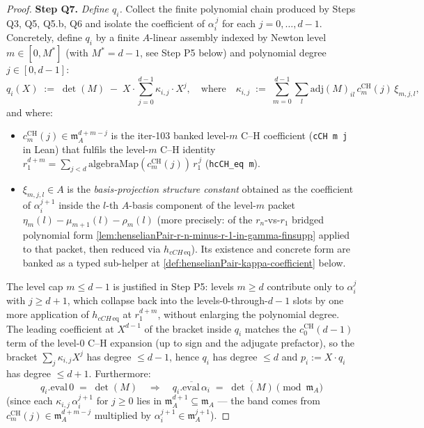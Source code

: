 \begin{proof}
\textbf{Step Q7.} \emph{Define $q_i$.}
Collect the finite polynomial chain produced by Steps Q3, Q5,
Q5.b, Q6 and isolate the coefficient of $\alpha_i^{\,j}$ for
each $j = 0, \ldots, d - 1$. Concretely, define $q_i$ by a
finite $A$-linear assembly indexed by Newton level
$m \in [0, M^*]$ (with $M^* = d - 1$, see Step P5 below) and
polynomial degree $j \in [0, d - 1]$:
\[
q_i(X) \;:=\;
\det(M)
\;-\; X \cdot \!\!\!\sum_{j = 0}^{d-1}\!\!
\kappa_{i,j} \cdot X^{j},
\quad\text{where}\quad
\kappa_{i,j} \;:=\; \sum_{m = 0}^{d - 1} \sum_l
\mathrm{adj}(M)_{il}\,c^{\mathrm{CH}}_m(j)\,\xi_{m,j,l},
\]
and where:
\begin{itemize}
\item $c^{\mathrm{CH}}_m(j) \in \mathfrak m_A^{d + m - j}$ is the
iter-103 banked level-$m$ C--H coefficient (\texttt{cCH m j} in
Lean) that fulfils the level-$m$ C--H identity
$r_1^{d+m} = \sum_{j < d} \mathrm{algebraMap}(c^{\mathrm{CH}}_m(j))
\,r_1^{\,j}$ (\texttt{hcCH\_eq m}).
\item $\xi_{m,j,l} \in A$ is the \emph{basis-projection structure
constant} obtained as the coefficient of $\alpha_i^{j+1}$ inside
the $l$-th $A$-basis component of the level-$m$ packet
$\eta_m(l) - \mu_{m+1}(l) - \rho_m(l)$ (more precisely: of the
$r_n$-vs-$r_1$ bridged polynomial form
\cref{lem:henselianPair-r-n-minus-r-1-in-gamma-finsupp} applied
to that packet, then reduced via $h_{cCH\,\mathrm{eq}}$). Its
existence and concrete form are banked as a typed sub-helper at
\cref{def:henselianPair-kappa-coefficient} below.
\end{itemize}
The level cap $m \le d - 1$ is justified in Step P5: levels
$m \ge d$ contribute only to $\alpha_i^{j}$ with $j \ge d + 1$,
which collapse back into the levels-$0$-through-$d-1$ slots by
one more application of $h_{cCH\,\mathrm{eq}}$ at $r_1^{d+m}$,
without enlarging the polynomial degree. The leading coefficient
at $X^{d - 1}$ of the bracket inside $q_i$ matches the
$c^{\mathrm{CH}}_0(d-1)$ term of the level-$0$ C--H expansion (up
to sign and the adjugate prefactor), so the bracket
$\sum_j \kappa_{i,j} X^j$ has degree $\le d - 1$, hence $q_i$ has
degree $\le d$ and $p_i := X \cdot q_i$ has degree $\le d + 1$.
Furthermore:
\[
q_i.\mathrm{eval}\,0 \;=\; \det(M)
\quad\Longrightarrow\quad
\overline{q_i.\mathrm{eval}\,\alpha_i}
\;=\; \overline{\det(M)} \pmod{\mathfrak m_A}
\]
(since each $\kappa_{i,j}\,\alpha_i^{j+1}$ for $j \ge 0$ lies in
$\mathfrak m_A^{d+1} \subseteq \mathfrak m_A$ — the band comes
from $c^{\mathrm{CH}}_m(j) \in \mathfrak m_A^{d+m-j}$ multiplied
by $\alpha_i^{j+1} \in \mathfrak m_A^{j+1}$).


\end{proof}
